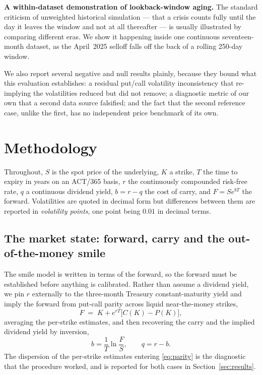 \documentclass[11pt]{article}
\begin{document}
\textbf{A within-dataset demonstration of lookback-window aging.} The standard criticism
of unweighted historical simulation --- that a crisis counts fully until the day it
leaves the window and not at all thereafter --- is usually illustrated by comparing
different eras. We show it happening inside one continuous seventeen-month dataset, as
the April~2025 selloff falls off the back of a rolling 250-day window.

We also report several negative and null results plainly, because they bound what this
evaluation establishes: a residual put/call volatility inconsistency that
re-implying the volatilities reduced but did not remove; a diagnostic metric of our own
that a second data source falsified; and the fact that the second reference case, unlike
the first, has no independent price benchmark of its own.

\section{Methodology}
\label{sec:method}

Throughout, $S$ is the spot price of the underlying, $K$ a strike, $T$ the time to
expiry in years on an ACT/365 basis, $r$ the continuously compounded risk-free rate,
$q$ a continuous dividend yield, $b=r-q$ the cost of carry, and $F=Se^{bT}$ the forward.
Volatilities are quoted in decimal form but differences between them are reported in
\emph{volatility points}, one point being $0.01$ in decimal terms.

\subsection{The market state: forward, carry and the out-of-the-money smile}
\label{sec:forward}

The smile model is written in terms of the forward, so the forward must be established
before anything is calibrated. Rather than assume a dividend yield, we pin $r$
externally to the three-month Treasury constant-maturity yield \citep{fred} and imply
the forward
from put-call parity across liquid near-the-money strikes,
\begin{equation}
  F \;=\; K + e^{rT}\bigl[C(K)-P(K)\bigr],
  \label{eq:parity}
\end{equation}
averaging the per-strike estimates, and then recovering the carry and the implied
dividend yield by inversion,
\begin{equation}
  b=\frac{1}{T}\ln\!\frac{F}{S},
  \qquad
  q=r-b .
  \label{eq:carry}
\end{equation}
The dispersion of the per-strike estimates entering \eqref{eq:parity} is the diagnostic
that the procedure worked, and is reported for both cases in Section~\ref{sec:results}.
\end{document}
